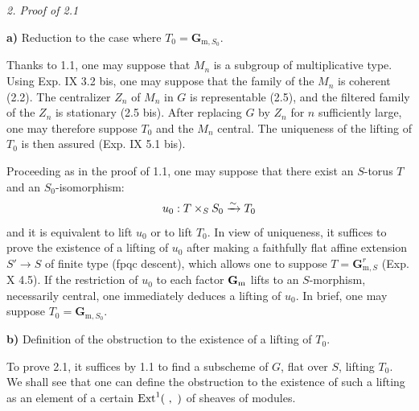 \par\medskip\noindent\textit{2. Proof of 2.1}\par
\noindent\textbf{a)} Reduction to the case where $T_0=\mathbf G_{\mathrm m,S_0}$.

Thanks to 1.1, one may suppose that $M_n$ is a subgroup of multiplicative type. Using Exp. IX 3.2 bis, one may suppose that the family of the $M_n$ is coherent (2.2). The centralizer $Z_n$ of $M_n$ in $G$ is representable (2.5), and the filtered family of the $Z_n$ is stationary (2.5 bis). After replacing $G$ by $Z_n$ for $n$ sufficiently large, one may therefore suppose $T_0$ and the $M_n$ central. The uniqueness of the lifting of $T_0$ is then assured (Exp. IX 5.1 bis).

Proceeding as in the proof of 1.1, one may suppose that there exist an $S$-torus $T$ and an $S_0$-isomorphism:
\[
u_0:T\times_S S_0\xrightarrow{\sim} T_0
\]
and it is equivalent to lift $u_0$ or to lift $T_0$. In view of uniqueness, it suffices to prove the existence of a lifting of $u_0$ after making a faithfully flat affine extension $S'\to S$ of finite type (fpqc descent), which allows one to suppose $T=\mathbf G_{\mathrm m,S}^r$ (Exp. X 4.5). If the restriction of $u_0$ to each factor $\mathbf{G}_{\mathrm{m}}$ lifts to an $S$-morphism, necessarily central, one immediately deduces a lifting of $u_0$. In brief, one may suppose $T_0=\mathbf G_{\mathrm m,S_0}$.

\noindent\textbf{b)} Definition of the obstruction to the existence of a lifting of $T_0$.

To prove 2.1, it suffices by 1.1 to find a subscheme of $G$, flat over $S$, lifting $T_0$. We shall see that one can define the obstruction to the existence of such a lifting as an element of a certain $\operatorname{Ext}^1(\ ,\ )$ of sheaves of modules.


